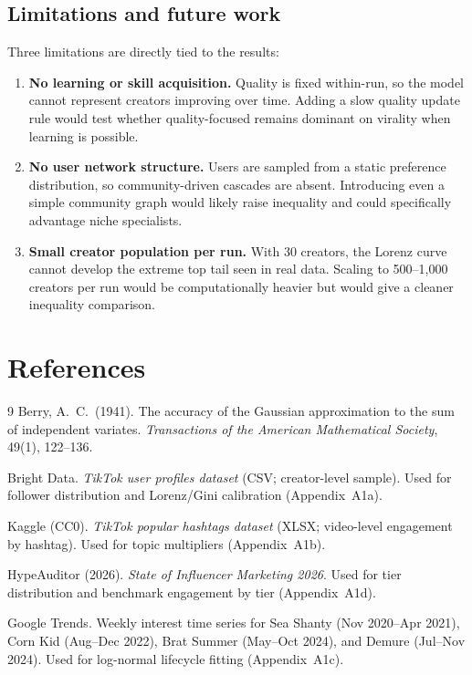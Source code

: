 \documentclass[10pt]{article}
\newcommand{\appref}[1]{(Appendix~#1)}
\begin{document}
\subsection{Limitations and future work}
Three limitations are directly tied to the results:
\begin{enumerate}
  \item \textbf{No learning or skill acquisition.} Quality is fixed within-run, so the model cannot represent creators improving over time. Adding a slow quality update rule would test whether quality-focused remains dominant on virality when learning is possible.
  \item \textbf{No user network structure.} Users are sampled from a static preference distribution, so community-driven cascades are absent. Introducing even a simple community graph would likely raise inequality and could specifically advantage niche specialists.
  \item \textbf{Small creator population per run.} With 30 creators, the Lorenz curve cannot develop the extreme top tail seen in real data. Scaling to 500--1{,}000 creators per run would be computationally heavier but would give a cleaner inequality comparison.
\end{enumerate}

\section{References}
\begin{thebibliography}{9}
Berry, A.\ C.\ (1941).
The accuracy of the Gaussian approximation to the sum of independent variates.
\textit{Transactions of the American Mathematical Society}, 49(1), 122--136.

Bright Data.
\textit{TikTok user profiles dataset} (CSV; creator-level sample).
Used for follower distribution and Lorenz/Gini calibration \appref{A1a}.

Kaggle (CC0).
\textit{TikTok popular hashtags dataset} (XLSX; video-level engagement by hashtag).
Used for topic multipliers \appref{A1b}.

HypeAuditor (2026).
\textit{State of Influencer Marketing 2026}.
Used for tier distribution and benchmark engagement by tier \appref{A1d}.

Google Trends.
Weekly interest time series for Sea Shanty (Nov 2020--Apr 2021), Corn Kid (Aug--Dec 2022), Brat Summer (May--Oct 2024), and Demure (Jul--Nov 2024).
Used for log-normal lifecycle fitting \appref{A1c}.
\end{thebibliography}
\end{document}
